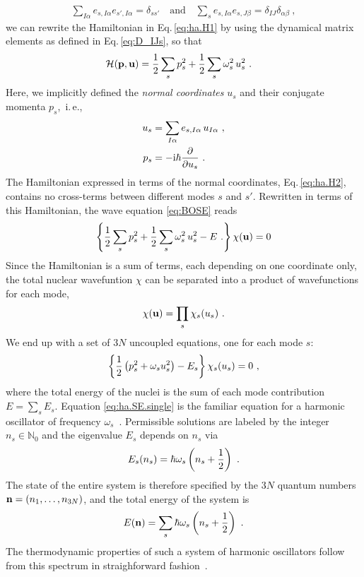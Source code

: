 \begin{align}
	\sum_{I \alpha} e_{s, I \alpha} e_{s', I \alpha} = \delta_{s s'}
	\quad \text{and} \quad
	\sum_{s} e_{s, I \alpha} e_{s, J \beta} = \delta_{IJ} \delta_{\alpha \beta}~,
\end{align}
we can rewrite the Hamiltonian in Eq.\,\eqref{eq:ha.H1} by using the dynamical matrix elements as defined in Eq.\,\eqref{eq:D_IJs}, so that
\begin{align}
	\mathcal{H}( {\bf p},  {\bf u})
		&= \halb \sum_s p_s^2 + 
		\halb \sum_{s} \omega_s^2	\, u_s^2~.
\label{eq:ha.H2}
\end{align}
Here, we implicitly defined the \emph{normal coordinates} $u_s$ and their conjugate momenta $p_s$,~i.\,e.,
\begin{align}
	u_s
		&= \sum_{I \alpha} e_{s, I \alpha} \, u_{I \alpha}~,
		\label{eq:u_s} \\
	p_s
		&= -\im \hbar \frac{\partial}{\partial u_s}~.
		\label{eq:p_s}
\end{align}
The Hamiltonian expressed in terms of the normal coordinates, Eq.\,\eqref{eq:ha.H2}, contains no cross-terms between different modes $s$ and $s'$. Rewritten in terms of this Hamiltonian, the wave equation \eqref{eq:BOSE} reads
\begin{align}
	\left\{
		\halb \sum_s p_s^2 + \halb \sum_{s} \omega_s^2	\, u_s^2 - E~.
	\right\} \chi ({\bf u})
	= 0
	\label{eq:ha.SE.2}
\end{align}
Since the Hamiltonian is a sum of terms, each depending on one coordinate only, the total nuclear wavefuntion $\chi$ can be separated into a product of wavefunctions for each mode,
\begin{align}
	\chi({\bf u}) = \prod_{s} \chi_s (u_s)~.
	\label{eq:ha.chi}
\end{align}
We end up with a set of $3N$ uncoupled equations, one for each mode $s$:
\begin{align}
	\left\{	\halb \left( p_s^2 + \omega_s u_s^2 \right)	- E_s	\right\} \chi_s (u_s)
		= 0~,
	\label{eq:ha.SE.single}
\end{align}
where the total energy of the nuclei is the sum of each mode contribution $E = \sum_s E_s$. Equation \eqref{eq:ha.SE.single} is the familiar equation for a harmonic oscillator of frequency $\omega_s$~\cite{Dirac1981}. Permissible solutions are labeled by the integer $n_s \in \mathds N_0$ and the eigenvalue $E_s$ depends on $n_s$ via
\begin{align}
	E_s(n_s) = \hbar \omega_s \left( n_s + \halb \right)~.
	\label{eq:E_s}
\end{align}
The state of the entire system is therefore specified by the $3N$ quantum numbers ${\bf n} = (n_1, \ldots, n_{3N})$, and the total energy of the system is
\begin{align}
	E ({\bf n}) = \sum_s \hbar \omega_s \left( n_s + \frac{1}{2} \right)~.
\end{align}
The thermodynamic properties of such a system of harmonic oscillators follow from this spectrum in straighforward fashion~\cite{BornHuang}.

